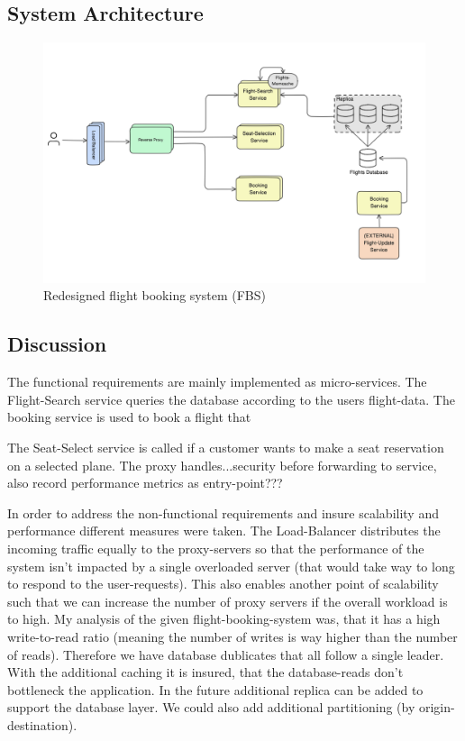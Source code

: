 \documentclass{article}
\begin{document}
\subsection{System Architecture}
\begin{figure}
    \centering
    \includegraphics[width=\linewidth]{images/1st_system_design_sketch.png}
    \caption{Redesigned flight booking system (FBS)}
    \label{fig:fbs_design}
\end{figure}
\newpage 

\subsection{Discussion}
The functional requirements are mainly implemented as micro-services.
The Flight-Search service queries the database according to the users flight-data. The booking service is used to book a flight that 

The Seat-Select service is called if a customer wants to make a seat reservation on a selected plane. 
The proxy handles...security before forwarding to service, also record performance metrics as entry-point???

In order to address the non-functional requirements and insure scalability and performance different measures were taken. 
The Load-Balancer distributes the incoming traffic equally to the proxy-servers so that the performance of the system isn't impacted by a single overloaded server (that would take way to long to respond to the user-requests). This also enables another point of scalability such that we can increase the number of proxy servers if the overall workload is to high.
My analysis of the given flight-booking-system was, that it has a high write-to-read ratio (meaning the number of writes is way higher than the number of reads). Therefore we have database dublicates that all follow a single leader. With the additional caching it is insured, that the database-reads don't bottleneck the application. In the future additional replica can be added to support the database layer. We could also add additional partitioning (by origin-destination). 
\end{document}
